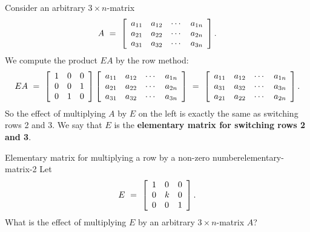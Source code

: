 \documentclass{ximera}
\begin{document}
\begin{solution}
  Consider an arbitrary $3\times n$-matrix
  \begin{equation*}
    A ~=~ \startmat{cccc}
      a_{11} & a_{12} & \cdots & a_{1n} \\
      a_{21} & a_{22} & \cdots & a_{2n} \\
      a_{31} & a_{32} & \cdots & a_{3n} \\
    \stopmat.
  \end{equation*}
  We compute the product $EA$ by the row method:
  \begin{equation*}
    EA ~=~ \startmat{lll}
      1 & 0 & 0 \\
      0 & 0 & 1 \\
      0 & 1 & 0 \\
    \stopmat
    \startmat{cccc}
      a_{11} & a_{12} & \cdots & a_{1n} \\
      a_{21} & a_{22} & \cdots & a_{2n} \\
      a_{31} & a_{32} & \cdots & a_{3n} \\
    \stopmat
    ~=~
    \startmat{cccc}
      a_{11} & a_{12} & \cdots & a_{1n} \\
      a_{31} & a_{32} & \cdots & a_{3n} \\
      a_{21} & a_{22} & \cdots & a_{2n} \\
    \stopmat.
  \end{equation*}
  So the effect of multiplying $A$ by $E$ on the left is exactly the
  same as switching rows 2 and 3. We say that $E$ is the
  \textbf{elementary matrix for switching rows 2 and 3}.
\end{solution}

\begin{example}{Elementary matrix for multiplying a row by a non-zero number}{elementary-matrix-2}
  Let
  \begin{equation*}
    E ~=~ \startmat{lll}
      1 & 0 & 0 \\
      0 & k & 0 \\
      0 & 0 & 1 \\
    \stopmat.
  \end{equation*}
  What is the effect of multiplying $E$ by an arbitrary $3\times
  n$-matrix $A$?
\end{example}
\end{document}
